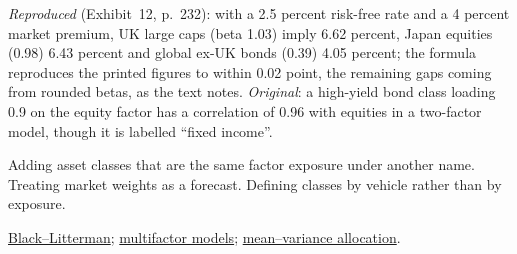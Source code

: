 \begin{qfmethod}
 \emph{Reproduced} (Exhibit~12, p.~232): with a 2.5 percent risk-free rate and a 4 percent market premium, UK large caps (beta 1.03) imply 6.62 percent, Japan equities (0.98) 6.43 percent and global ex-UK bonds (0.39) 4.05 percent; the formula reproduces the printed figures to within 0.02 point, the remaining gaps coming from rounded betas, as the text notes. \emph{Original}: a high-yield bond class loading 0.9 on the equity factor has a correlation of 0.96 with equities in a two-factor model, though it is labelled ``fixed income''.

 Adding asset classes that are the same factor exposure under another name. Treating market weights as a forecast. Defining classes by vehicle rather than by exposure.

 \hyperref[mod:black-litterman]{Black--Litterman}; \hyperref[mod:multifactor-apt]{multifactor models}; \hyperref[meth:asset-only-allocation-mvo]{mean--variance allocation}.

\end{qfmethod}

